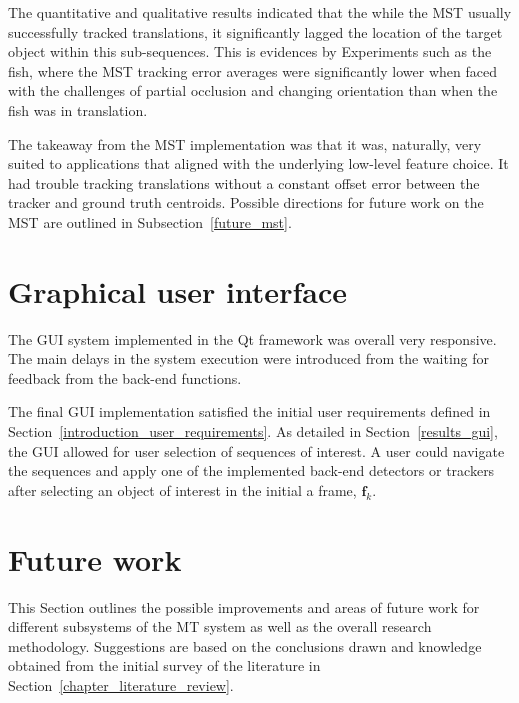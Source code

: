 The quantitative and qualitative results indicated that the while the MST
usually successfully tracked translations, it significantly
lagged the location of the target object within this sub-sequences. This is
evidences by Experiments such as the fish, where the MST tracking error averages
were significantly lower when faced with the challenges of partial occlusion and
changing orientation than when the fish was in translation.

The takeaway from the MST implementation was that it was, naturally, very suited to
applications that aligned with the underlying low-level feature choice. It had
trouble tracking translations without a constant offset error between the
tracker and ground truth centroids. Possible directions for future work on the
MST are outlined in Subsection~\ref{future_mst}.

\section{Graphical user interface}
The GUI system implemented in the Qt framework was overall very responsive. The
main delays in the system execution were introduced from the waiting for
feedback from the back-end functions.

The final GUI implementation satisfied the initial user requirements defined in
Section~\ref{introduction_user_requirements}. As detailed in
Section~\ref{results_gui}, the GUI allowed for user selection of sequences of
interest. A user could navigate the sequences and apply one of the implemented
back-end detectors or trackers after selecting an object of interest in the
initial a frame, $\mathbf{f}_k$.

\section{Future work}\label{future}
This Section outlines the possible improvements and areas
of future work for different subsystems of the MT system as well as the overall
research methodology. Suggestions are based
on the conclusions drawn and knowledge obtained from the initial survey of the
literature in Section~\ref{chapter_literature_review}.

